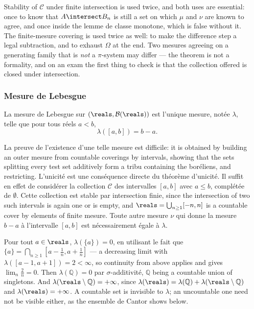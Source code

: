 \begin{remark}
  Stability of $\mathcal{C}$ under finite intersection is used twice, and both uses
  are essential: once to know that $A \intersect B_{n}$ is still a set on which $\mu$
  and $\nu$ are known to agree, and once inside the lemme de classe monotone, which
  is false without it. The finite-mesure covering is used twice as well: to make the
  difference step a legal subtraction, and to exhaust $\Omega$ at the end. Two
  mesures agreeing on a generating family that is \emph{not} a $\pi$-system may
  differ --- the theorem is not a formality, and on an exam the first thing to check
  is that the collection offered is closed under intersection.
\end{remark}

\subsubsection{Mesure de Lebesgue}

\begin{definition}
  La mesure de Lebesgue sur $(\reals,\mathcal{B}(\reals))$ est l'unique mesure,
  notée $\lambda$, telle que pour tous réels $a < b$,
  \[
    \lambda([a,b]) = b - a.
  \]
\end{definition}

La preuve de l'existence d'une telle mesure est difficile: it is obtained by
building an outer mesure from countable coverings by intervals, showing that the
sets splitting every test set additively form a tribu containing the boréliens, and
restricting. L'unicité est une conséquence directe du théorème d'unicité. Il suffit
en effet de considérer la collection $\mathcal{C}$ des intervalles $[a,b]$ avec $a
\leq b$, complétée de $\emptyset$. Cette collection est stable par intersection
finie, since the intersection of two such intervals is again one or is empty, and
$\reals = \bigcup_{n \geq 1} [-n,n]$ is a countable cover by elements of finite
mesure. Toute autre mesure $\nu$ qui donne la mesure $b - a$ à l'intervalle $[a,b]$
est nécessairement égale à $\lambda$.

\begin{remark}
  Pour tout $a \in \reals$, $\lambda(\{a\}) = 0$, en utilisant le fait que $\{a\} =
  \bigcap_{n \geq 1} [a - \tfrac{1}{n}, a + \tfrac{1}{n}]$ --- a decreasing limit
  with $\lambda([a-1,a+1]) = 2 < \infty$, so continuity from above applies and gives
  $\lim_{n} \tfrac{2}{n} = 0$. Then $\lambda(\mathbb{Q}) = 0$ par
  $\sigma$-additivité, $\mathbb{Q}$ being a countable union of singletons. And
  $\lambda(\reals \setminus \mathbb{Q}) = +\infty$, since
  $\lambda(\reals) = \lambda(\mathbb{Q}) + \lambda(\reals \setminus \mathbb{Q})$ and
  $\lambda(\reals) = +\infty$. A countable set is invisible to $\lambda$; an
  uncountable one need not be visible either, as the ensemble de Cantor shows below.
\end{remark}

